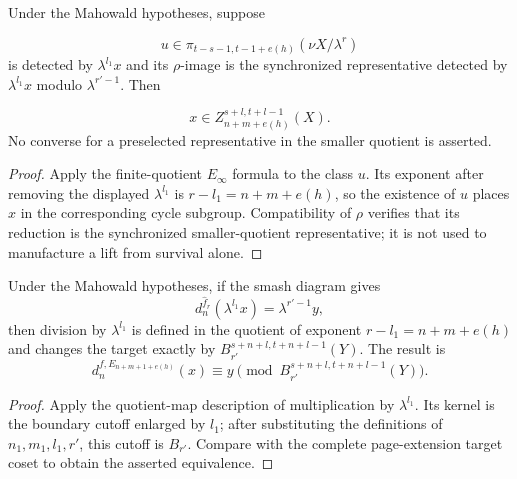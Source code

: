 \begin{lemma}
  \label{lem:mahowald-quotient-lift-survival}
  \notready
  Under the Mahowald hypotheses, suppose

  \[
    u\in\pi_{t-s-1,t-1+e(h)}(\nu X/\lambda^r)
  \]
  is detected by $\lambda^{l_1}x$ and its $\rho$-image is the synchronized
  representative detected by $\lambda^{l_1}x$ modulo $\lambda^{r'-1}$.
  Then

  \[
    x\in Z_{n+m+e(h)}^{s+l,t+l-1}(X).
  \]
  No converse for a preselected representative in the smaller quotient is
  asserted.
\end{lemma}

\begin{proof}
  Apply the finite-quotient $E_\infty$ formula to the class $u$.  Its exponent
  after removing the displayed $\lambda^{l_1}$ is
  $r-l_1=n+m+e(h)$, so the existence of $u$ places $x$ in the corresponding
  cycle subgroup.  Compatibility of $\rho$ verifies that its reduction is the
  synchronized smaller-quotient representative; it is not used to manufacture
  a lift from survival alone.
\end{proof}

\begin{lemma}
  \label{lem:mahowald-lambda-division}
  \notready
  Under the Mahowald hypotheses, if the smash diagram gives
  \[
    d_n^{\widehat f_r}(\lambda^{l_1}x)=\lambda^{r'-1}y,
  \]
  then division by $\lambda^{l_1}$ is defined in the quotient of exponent
  $r-l_1=n+m+e(h)$ and changes the target exactly by
  $B_{r'}^{s+n+l,t+n+l-1}(Y)$.  The result is
  \[
    d_n^{f,E_{n+m+1+e(h)}}(x)
       \equiv y\pmod{B_{r'}^{s+n+l,t+n+l-1}(Y)}.
  \]
\end{lemma}

\begin{proof}
  Apply the quotient-map description of multiplication by $\lambda^{l_1}$.
  Its kernel is the boundary cutoff enlarged by $l_1$; after substituting the
  definitions of $n_1,m_1,l_1,r'$, this cutoff is $B_{r'}$.  Compare with the
  complete page-extension target coset to obtain the asserted equivalence.
\end{proof}


